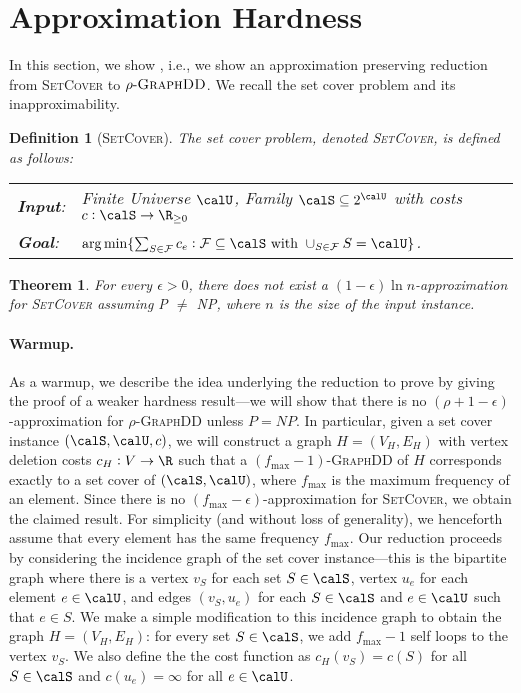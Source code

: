 \documentclass{article}
\newtheorem{theorem}{Theorem}[section]
\newtheorem{definition}{Definition}[section]
\newcommand{\fmax}{\ensuremath{f_{\max}}\xspace}
\newcommand{\densitydeletionset}{\textsc{GraphDD}\xspace}
\newcommand{\rhodensitydeletionset}{\ensuremath{\rho\text{-}}\densitydeletionset\xspace}
\newcommand{\dds}{\ensuremath{\textsc{GraphDD}}\xspace}
\newcommand{\rhodds}[1]{\ensuremath{#1\text{-}\dds}\xspace}
\newcommand{\setcover}{\textsc{SetCover}\xspace}
\begin{document}
\section{Approximation Hardness}\label{sec:set-cover-hardness}



In this section, we show , i.e., we show an approximation preserving reduction from \setcover to \rhodds{\rho}. We recall the set cover problem and its inapproximability. 

\begin{definition}[\setcover]
    The set cover problem, denoted \setcover, is defined as follows:
     \begin{mdframed}
\begin{tabular}{ l l }
 \emph{\textbf{Input}:} &  Finite Universe $\calU$, Family $\calS \subseteq 2^\calU$ with costs $c: \calS \rightarrow \R_{\ge 0}$
    \vspace{1mm}\\  
 \emph{\textbf{Goal}:} & $\arg \min\{\sum_{S\in \mathcal{F}}c_e : \mathcal{F} \subseteq \calS \text{ with } \cup_{S \in \mathcal{F}}S = \calU\}$. 
\end{tabular}
\end{mdframed}
\end{definition}

\begin{theorem}\cite{feige-98,DS14}\label{thm:set-cover-hardness}
    For every $\epsilon>0$, there does not exist a $(1-\epsilon)\ln{n}$-approximation for \setcover assuming P $\neq$ NP, where $n$ is the size of the input instance. 
\end{theorem}


\paragraph{Warmup. } As a warmup, we describe the idea underlying the reduction to prove  by giving the proof of a weaker hardness result---we will show that there is no $(\rho+1-\epsilon)$-approximation for \rhodensitydeletionset unless $P = NP$. In particular, given a set cover instance $(\calS, \calU, c)$, we will construct a graph $H = (V_H, E_H)$ with vertex deletion costs $c_H:V\rightarrow\R$ such that a $(\fmax-1)$-\densitydeletionset of $H$ corresponds exactly to a set cover of $(\calS, \calU)$, where $f_{\max}$ is the maximum frequency of an element. Since there is no $(f_{\max} - \epsilon)$-approximation for \setcover, we obtain the claimed result. For simplicity (and without loss of generality), we henceforth assume that every element has the same frequency $f_{\max}$. Our reduction proceeds by considering the incidence graph of the set cover instance---this is the bipartite graph where there is a vertex $v_S$ for each set $S \in \calS$, vertex $u_e$ for each element $e \in \calU$, and edges $(v_S, u_e)$ for each $S\in\calS$ and $e \in \calU$ such that $e \in S$. We make a simple modification to this incidence graph to obtain the graph $H = (V_H, E_H)$: for every set $S\in \calS$, we add $f_{\max}-1$ self loops to the vertex $v_S$. We also define the the cost function as $c_H(v_S) = c(S)$ for all $S \in \calS$ and $c(u_e) = \infty$ for all $e\in \calU$.
\end{document}
